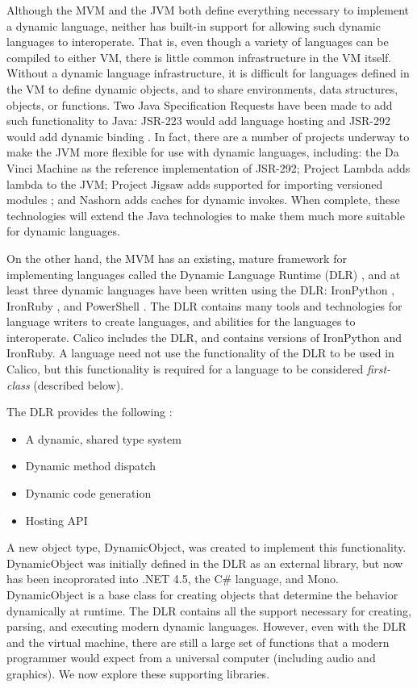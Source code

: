 \documentclass[preprint]{sigplanconf}
\begin{document}
Although the MVM and the JVM both define everything necessary to
implement a dynamic language, neither has built-in support for
allowing such dynamic languages to interoperate. That is, even though
a variety of languages can be compiled to either VM, there is little
common infrastructure in the VM itself. Without a dynamic language
infrastructure, it is difficult for languages defined in the VM to
define dynamic objects, and to share environments, data structures,
objects, or functions. Two Java Specification Requests have been made
to add such functionality to Java: JSR-223 would add language hosting
and JSR-292 would add dynamic binding \cite{wu-2010}. In fact, there are a
number of projects underway to make the JVM more flexible for use with
dynamic languages, including: the Da Vinci Machine \cite{java-davinci}
as the reference implementation of JSR-292; Project Lambda
\cite{java-lambda} adds lambda to the JVM; Project Jigsaw adds
supported for importing versioned modules \cite{java-jigsaw}; and
Nashorn \cite{java-nashorn} adds caches for dynamic invokes. When
complete, these technologies will extend the Java technologies to make
them much more suitable for dynamic languages.

On the other hand, the MVM has an existing, mature framework for
implementing languages called the Dynamic Language Runtime (DLR)
\cite{dlr-microsoft}, and at least three dynamic languages have been
written using the DLR: IronPython \cite{ironpython}, IronRuby
\cite{ironruby}, and PowerShell \cite{powershell}. The DLR contains
many tools and technologies for language writers to create languages,
and abilities for the languages to interoperate. Calico includes the
DLR, and contains versions of IronPython and IronRuby. A language need
not use the functionality of the DLR to be used in Calico, but this
functionality is required for a language to be considered
\textit{first-class} (described below).

The DLR provides the following \cite{dlr-wikipedia}:
\begin{itemize}
\item A dynamic, shared type system 
\item Dynamic method dispatch
\item Dynamic code generation
\item Hosting API
\end{itemize}

A new object type, DynamicObject, was created to implement this
functionality. DynamicObject was initially defined in the DLR as an
external library, but now has been incoprorated into .NET 4.5, the C\#
language, and Mono. DynamicObject is a base class for creating objects
that determine the behavior dynamically at runtime. The DLR contains
all the support necessary for creating, parsing, and executing modern
dynamic languages. However, even with the DLR and the virtual machine,
there are still a large set of functions that a modern programmer
would expect from a universal computer (including audio and
graphics). We now explore these supporting libraries.
\end{document}
